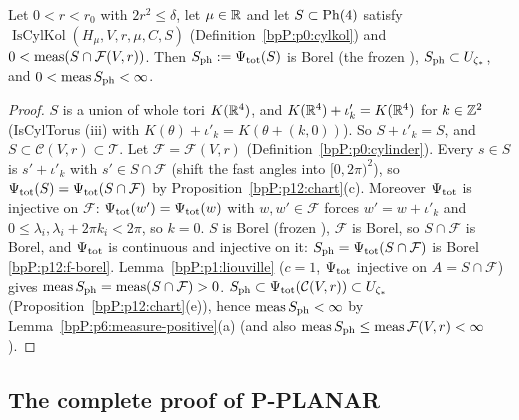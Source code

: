 \begin{proposition}\label{bpP:p12:measure}
Let $0<r<r_0$ with $2r^2\le\delta$, let $\mu\in\mathbb{R}$ and let $S\subset\mathrm{Ph}(4)$ satisfy $\operatorname{IsCylKol}(H_\mu,V,r,\mu,C,S)$ (Definition~\ref{bpP:p0:cylkol}) and $0<\operatorname{meas}(S\cap\mathcal F(V,r))$. Then $S_{\rm ph}:=\Psi_{\rm tot}(S)$ is Borel (the frozen ), $S_{\rm ph}\subset U_{\zeta_*}$, and $0<\operatorname{meas} S_{\rm ph}<\infty$.
\end{proposition}
\begin{proof}
\label{stepP:p12:me-inv} $S$ is a union of whole tori $K(\mathbb{R}^4)$, and $K(\mathbb{R}^4)+\iota'_k=K(\mathbb{R}^4)$ for $k\in\mathbb{Z}^2$ (IsCylTorus (iii) with $K(\theta)+\iota'_k=K(\theta+(k,0))$). So $S+\iota'_k=S$, and $S\subset\mathcal C(V,r)\subset\mathcal T$.
\label{stepP:p12:me-cell} Let $\mathcal F=\mathcal F(V,r)$ (Definition~\ref{bpP:p0:cylinder}). Every $s\in S$ is $s'+\iota'_k$ with $s'\in S\cap\mathcal F$ (shift the fast angles into $[0,2\pi)^2$), so $\Psi_{\rm tot}(S)=\Psi_{\rm tot}(S\cap\mathcal F)$ by Proposition~\ref{bpP:p12:chart}(c). Moreover $\Psi_{\rm tot}$ is injective on $\mathcal F$: $\Psi_{\rm tot}(w')=\Psi_{\rm tot}(w)$ with $w,w'\in\mathcal F$ forces $w'=w+\iota'_k$ and $0\le\lambda_i,\lambda_i+2\pi k_i<2\pi$, so $k=0$.
\label{stepP:p12:me-meas} $S$ is Borel (frozen ), $\mathcal F$ is Borel, so $S\cap\mathcal F$ is Borel, and $\Psi_{\rm tot}$ is continuous and injective on it: $S_{\rm ph}=\Psi_{\rm tot}(S\cap\mathcal F)$ is Borel \ref{bpP:p12:f-borel}. Lemma~\ref{bpP:p1:liouville} ($c=1$, $\Psi_{\rm tot}$ injective on $A=S\cap\mathcal F$) gives $\operatorname{meas} S_{\rm ph}=\operatorname{meas}(S\cap\mathcal F)>0$.
\label{stepP:p12:me-tube} $S_{\rm ph}\subset\Psi_{\rm tot}(\mathcal C(V,r))\subset U_{\zeta_*}$ (Proposition~\ref{bpP:p12:chart}(e)), hence $\operatorname{meas} S_{\rm ph}<\infty$ by Lemma~\ref{bpP:p6:measure-positive}(a) (and also $\operatorname{meas} S_{\rm ph}\le\operatorname{meas}\mathcal F(V,r)<\infty$).
\end{proof}

\subsection{The complete proof of P-PLANAR}\label{bpP:p12:sec-main}

